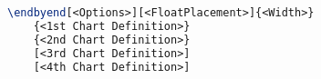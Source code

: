 \begin{lstlisting}[language=LaTeX, label=listing:end-by-end-charts]
\endbyend[<Options>][<FloatPlacement>]{<Width>}
    {<1st Chart Definition>}
    {<2nd Chart Definition>}
    [<3rd Chart Definition>]
    [<4th Chart Definition>]
\end{lstlisting}